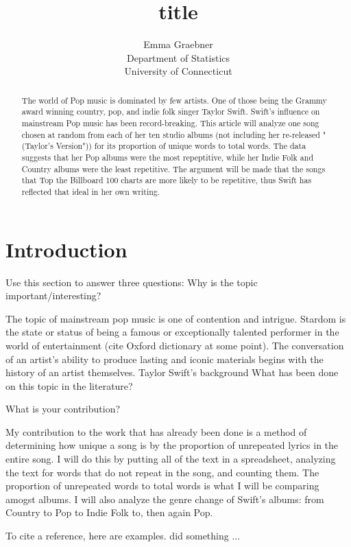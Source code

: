 \documentclass[12pt]{article}
\title{title}
\author{Emma Graebner\\
  Department of Statistics\\
  University of Connecticut
}
\begin{document}
\maketitle

\begin{abstract}
The world of Pop music is dominated by few artists. One of those being the Grammy award winning country, pop, and indie folk singer Taylor Swift. Swift's influence on mainstream Pop music has been record-breaking. This article will analyze one song chosen at random from each of her ten studio albums (not including her re-released "(Taylor's Version")) for its proportion of unique words to total words. The data suggests that her Pop albums were the most repeptitive, while her Indie Folk and Country albums were the least repetitive. The argument will be made that the songs that Top the Billboard 100 charts are more likely to be repetitive, thus Swift has reflected that ideal in her own writing.  
\end{abstract}


\section{Introduction}
\label{sec:intro}

Use this section to answer three questions:
Why is the topic important/interesting?

  The topic of mainstream pop music is one of contention and intrigue. Stardom is the state or status of being a famous or exceptionally talented performer in the world of entertainment (cite Oxford dictionary at some point). The conversation of an artist's ability to produce lasting and iconic materials begins with the history of an artist themselves. Taylor Swift's background 
What has been done on this topic in the literature?

What is your contribution?

My contribution to the work that has already been done is a method of determining how unique a song is by the proportion of unrepeated lyrics in the entire song. I will do this by putting all of the text in a spreadsheet, analyzing the text for words that do not repeat in the song, and counting them. The proportion of unrepeated words to total words is what I will be comparing amogst albums.
I will also analyze the genre change of Swift's albums: from Country to Pop to Indie Folk to, then again Pop.   



To cite a reference, here are examples.
\citet{xie2015dynamic} did something ... 
\end{document}
